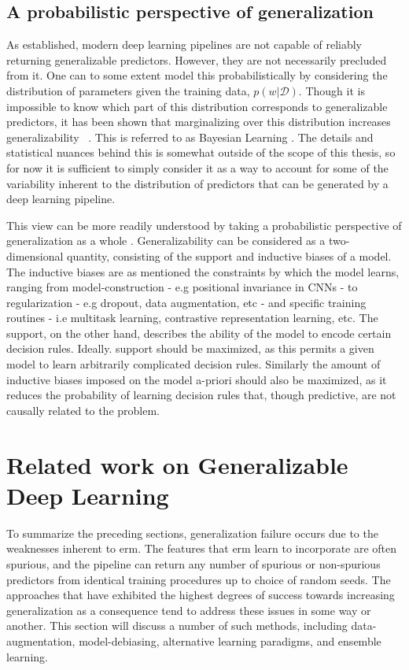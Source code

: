 	\subsection{A probabilistic perspective of generalization} \label{probpersp}
	As established, modern deep learning pipelines are not capable of reliably returning generalizable predictors. However, they are not necessarily precluded from it. One can to some extent model this probabilistically by considering the distribution of parameters given the training data, \(p(w | \mathcal{D})\). Though it is impossible to know which part of this distribution corresponds to generalizable predictors, it has been shown that marginalizing over this distribution increases generalizability ~\cite{bayesian_generalization,endoensemble,divergentnets,ensemble_machinereading}. This is referred to as Bayesian Learning \cite{bayesian_case}. The details and statistical nuances behind this is somewhat outside of the scope of this thesis, so for now it is sufficient to simply consider it as a way to account for some of the variability inherent to the distribution of predictors that can be generated by a deep learning pipeline. 

	This view can be more readily understood by taking a probabilistic perspective of generalization as a whole \cite{bayesian_generalization}. Generalizability can be considered as a two-dimensional quantity, consisting of the support and inductive biases of a model. The inductive biases are as mentioned the constraints by which the model learns, ranging from model-construction - e.g positional invariance in CNNs - to regularization - e.g dropout, data augmentation, etc - and specific training routines - i.e multitask learning, contrastive representation learning, etc. The support, on the other hand, describes the ability of the model to encode certain decision rules. Ideally. support should be maximized, as this permits a given model to learn arbitrarily complicated decision rules. Similarly the amount of inductive biases imposed on the model a-priori should also be maximized, as it reduces the probability of learning decision rules that, though predictive, are not causally related to the problem. 

\section{Related work on Generalizable Deep Learning}
To summarize the preceding sections, generalization failure occurs due to the weaknesses inherent to \gls{erm}. The features that \gls{erm} learn to incorporate are often spurious, and the pipeline can return any number of spurious or non-spurious predictors from identical training procedures up to choice of random seeds. The approaches that have exhibited the highest degrees of success towards increasing generalization as a consequence tend to address these issues in some way or another. This section will discuss a number of such methods, including data-augmentation, model-debiasing, alternative learning paradigms, and ensemble learning.

